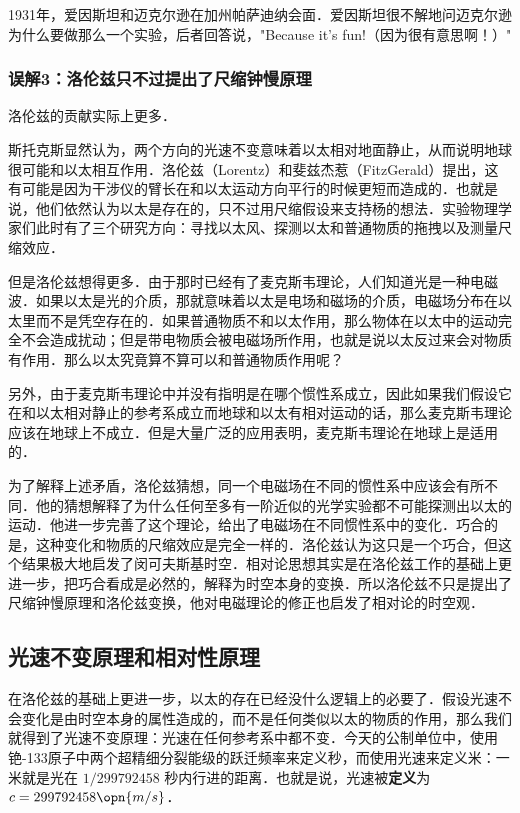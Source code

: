 1931年，爱因斯坦和迈克尔逊在加州帕萨迪纳会面．爱因斯坦很不解地问迈克尔逊为什么要做那么一个实验，后者回答说，"Because it's fun!（因为很有意思啊！）" 

\subsubsection{误解3：洛伦兹只不过提出了尺缩钟慢原理}

洛伦兹的贡献实际上更多．

斯托克斯显然认为，两个方向的光速不变意味着以太相对地面静止，从而说明地球很可能和以太相互作用．洛伦兹（Lorentz）和斐兹杰惹（FitzGerald）提出，这有可能是因为干涉仪的臂长在和以太运动方向平行的时候更短而造成的．也就是说，他们依然认为以太是存在的，只不过用尺缩假设来支持杨的想法．实验物理学家们此时有了三个研究方向：寻找以太风、探测以太和普通物质的拖拽以及测量尺缩效应．

但是洛伦兹想得更多．由于那时已经有了麦克斯韦理论，人们知道光是一种电磁波．如果以太是光的介质，那就意味着以太是电场和磁场的介质，电磁场分布在以太里而不是凭空存在的．如果普通物质不和以太作用，那么物体在以太中的运动完全不会造成扰动；但是带电物质会被电磁场所作用，也就是说以太反过来会对物质有作用．那么以太究竟算不算可以和普通物质作用呢？

另外，由于麦克斯韦理论中并没有指明是在哪个惯性系成立，因此如果我们假设它在和以太相对静止的参考系成立而地球和以太有相对运动的话，那么麦克斯韦理论应该在地球上不成立．但是大量广泛的应用表明，麦克斯韦理论在地球上是适用的．

为了解释上述矛盾，洛伦兹猜想，同一个电磁场在不同的惯性系中应该会有所不同．他的猜想解释了为什么任何至多有一阶近似的光学实验都不可能探测出以太的运动．他进一步完善了这个理论，给出了电磁场在不同惯性系中的变化．巧合的是，这种变化和物质的尺缩效应是完全一样的．洛伦兹认为这只是一个巧合，但这个结果极大地启发了闵可夫斯基时空．相对论思想其实是在洛伦兹工作的基础上更进一步，把巧合看成是必然的，解释为时空本身的变换．所以洛伦兹不只是提出了尺缩钟慢原理和洛伦兹变换，他对电磁理论的修正也启发了相对论的时空观．

\subsection{光速不变原理和相对性原理}

在洛伦兹的基础上更进一步，以太的存在已经没什么逻辑上的必要了．假设光速不会变化是由时空本身的属性造成的，而不是任何类似以太的物质的作用，那么我们就得到了光速不变原理：光速在任何参考系中都不变．今天的公制单位中，使用铯-133原子中两个超精细分裂能级的跃迁频率来定义秒，而使用光速来定义米：一米就是光在 $1/299792458$ 秒内行进的距离．也就是说，光速被\textbf{定义}为 $c=299792458\opn{m/s}$．

